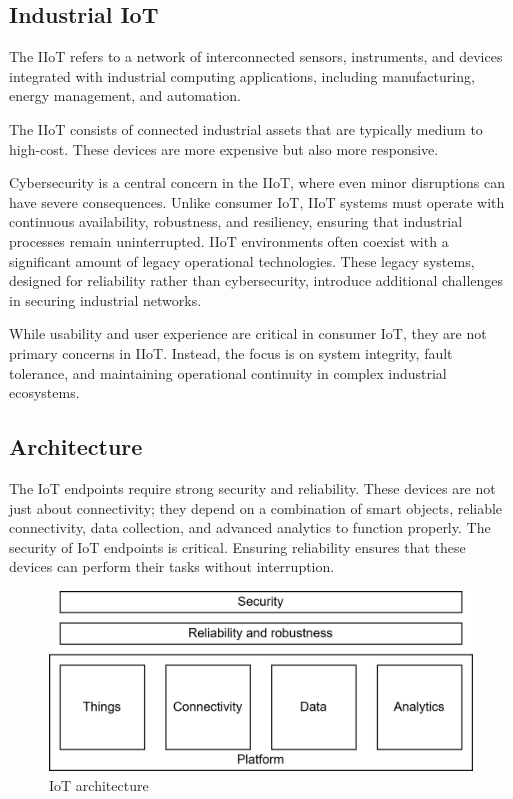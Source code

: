 \subsection{Industrial IoT}
\begin{definition}
    The IIoT refers to a network of interconnected sensors, instruments, and devices integrated with industrial computing applications, including manufacturing, energy management, and automation.
\end{definition}
The IIoT consists of connected industrial assets that are typically medium to high-cost. 
These devices are more expensive but also more responsive.

Cybersecurity is a central concern in the IIoT, where even minor disruptions can have severe consequences. 
Unlike consumer IoT, IIoT systems must operate with continuous availability, robustness, and resiliency, ensuring that industrial processes remain uninterrupted.
IIoT environments often coexist with a significant amount of legacy operational technologies. 
These legacy systems, designed for reliability rather than cybersecurity, introduce additional challenges in securing industrial networks.

While usability and user experience are critical in consumer IoT, they are not primary concerns in IIoT. 
Instead, the focus is on system integrity, fault tolerance, and maintaining operational continuity in complex industrial ecosystems.

\subsection{Architecture}
The IoT endpoints require strong security and reliability. 
These devices are not just about connectivity; they depend on a combination of smart objects, reliable connectivity, data collection, and advanced analytics to function properly.
The security of IoT endpoints is critical. 
Ensuring reliability ensures that these devices can perform their tasks without interruption.
\begin{figure}[H]
    \centering
    \includegraphics[width=0.75\linewidth]{images/iot1.png}
    \caption{IoT architecture}
\end{figure}